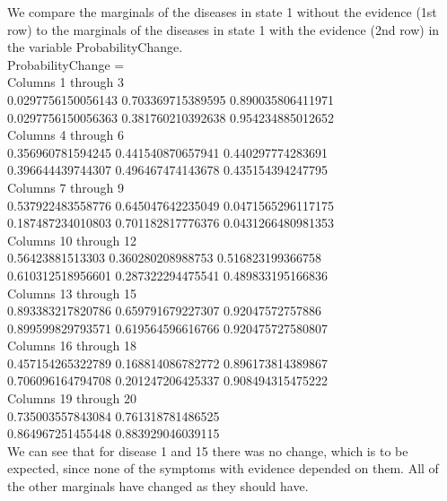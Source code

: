 \documentclass[11pt,a4paper,oneside]{report}
\begin{document}
We compare the marginals of the diseases in state 1 without the evidence (1st row) to the marginals of the diseases in state 1 with the evidence (2nd row) in the variable ProbabilityChange. \\

ProbabilityChange =\\
  Columns 1 through 3\\
        0.0297756150056143         0.703369715389595         0.890035806411971\\
        0.0297756150056363         0.381760210392638         0.954234885012652\\
  Columns 4 through 6\\
         0.356960781594245         0.441540870657941         0.440297774283691\\
         0.396644439744307         0.496467474143678         0.435154394247795\\
  Columns 7 through 9\\
         0.537922483558776         0.645047642235049        0.0471565296117175\\
         0.187487234010803         0.701182817776376        0.0431266480981353\\
  Columns 10 through 12\\
          0.56423881513303         0.360280208988753         0.516823199366758\\
         0.610312518956601         0.287322294475541         0.489833195166836\\
  Columns 13 through 15\\
         0.893383217820786         0.659791679227307          0.92047572757886\\
         0.899599829793571         0.619564596616766         0.920475727580807\\
  Columns 16 through 18\\
         0.457154265322789         0.168814086782772         0.896173814389867\\
         0.706096164794708         0.201247206425337         0.908494315475222\\
  Columns 19 through 20\\
         0.735003557843084         0.761318781486525\\
         0.864967251455448         0.883929046039115\\
         
	We can see that for disease 1 and 15 there was no change, which is to be expected, since none of the symptoms with evidence depended on them. All of the other marginals have changed as they should have.         
\end{document}

